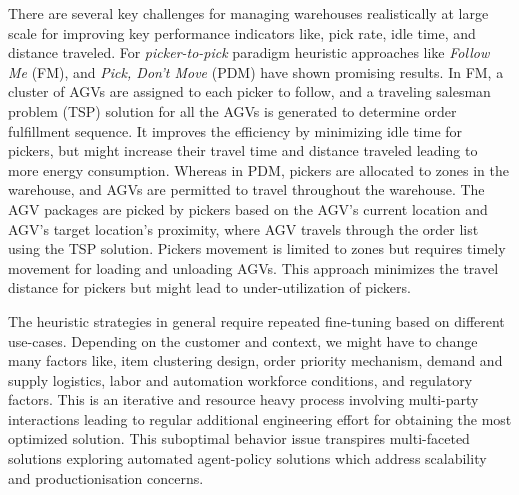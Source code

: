 \documentclass{article}
\begin{document}


There are several key challenges for managing warehouses realistically at large scale for improving key performance indicators like, pick rate, idle time, and distance traveled.
For \textit{picker-to-pick} paradigm heuristic approaches like \textit{Follow Me} (FM), and \textit{Pick, Don’t Move} (PDM) have shown promising results.
In FM, a cluster of AGVs are assigned to each picker to follow, and a traveling salesman problem (TSP) solution for all the AGVs is generated to determine order fulfillment sequence.
It improves the efficiency by minimizing idle time for pickers, but might increase their travel time and distance traveled leading to more energy consumption.
Whereas in PDM, pickers are allocated to zones in the warehouse, and AGVs are permitted to travel throughout the warehouse.
The AGV packages are picked by pickers based on the AGV’s current location and AGV’s target location’s proximity, where AGV travels through the order list using the TSP solution.
Pickers movement is limited to zones but requires timely movement for loading and unloading AGVs.
This approach minimizes the travel distance for pickers but might lead to under-utilization of pickers.


The heuristic strategies in general require repeated fine-tuning based on different use-cases.
Depending on the customer and context, we might have to change many factors like, item clustering design, order priority mechanism, demand and supply logistics, labor and automation workforce conditions, and regulatory factors.
This is an iterative and resource heavy process involving multi-party interactions leading to regular additional engineering effort for obtaining the most optimized solution.
This suboptimal behavior issue transpires multi-faceted solutions exploring automated agent-policy solutions which address scalability and productionisation concerns.
\end{document}

